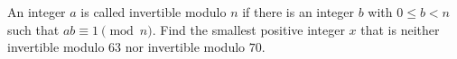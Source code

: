 An integer $a$ is called invertible modulo $n$ if there is an integer $b$ with $0\le b<n$ such that $ab\equiv1\pmod n$. Find the smallest positive integer $x$ that is neither invertible modulo $63$ nor invertible modulo $70$.
